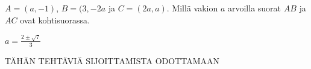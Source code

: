 \begin{tehtavasivu}
\begin{tehtava}
$A = (a,-1)$, $B = (3,-2a$ ja $C = (2a,a)$. Millä vakion $a$ arvoilla suorat $AB$ ja $AC$ ovat kohtisuorassa.
\begin{vastaus}
$a = \frac{2\pm \sqrt{7}}{3}$
\end{vastaus}
\end{tehtava}

TÄHÄN TEHTÄVIÄ SIJOITTAMISTA ODOTTAMAAN

\end{tehtavasivu}

